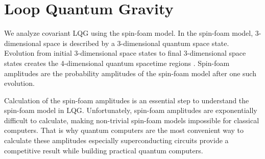 \documentclass[a4paper,11pt,aps,tightenlines,nofootinbib]{revtex4}
\begin{document}


\section{Loop Quantum Gravity}

        We analyze covariant LQG using the spin-foam model. In the spin-foam model,
        3-dimensional space is described by a 3-dimensional quantum space state. Evolution from 
        initial 3-dimensional space states to final 3-dimensional space states creates the 4-dimensional quantum spacetime regions \cite{covariant-lqg}. %
        Spin-foam amplitudes are the probability amplitudes of the spin-foam model after one such evolution.



        Calculation of the spin-foam amplitudes is an essential step to understand the spin-foam model in LQG. Unfortunately, spin-foam amplitudes are 
        exponentially difficult to calculate, making non-trivial spin-foam models impossible for classical computers. That is why quantum computers are 
        the most convenient way to calculate these amplitudes especially superconducting circuits provide a competitive result while building practical quantum computers.
\end{document}
